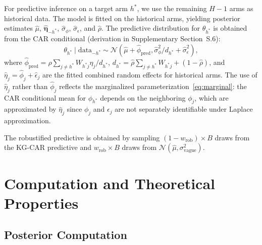 \documentclass[12pt]{article}
\begin{document}
For predictive inference on a target arm $h^*$, we use the remaining $H - 1$ arms as historical data. The model is fitted on the historical arms, yielding posterior estimates $\hat{\mu}$, $\hat{\boldsymbol{\eta}}_{-h^*}$, $\hat{\sigma}_\phi$, $\hat{\sigma}_\epsilon$, and $\hat{\rho}$. The predictive distribution for $\theta_{h^*}$ is obtained from the CAR conditional (derivation in Supplementary Section~S.6):
\begin{equation}
\label{eq:predictive}
\theta_{h^*} \mid \text{data}_{-h^*} \sim \mathcal{N}\left(\hat{\mu} + \hat{\phi}_{\text{pred}}, \hat{\sigma}_\phi^2 / d_{h^*} + \hat{\sigma}_\epsilon^2\right),
\end{equation}
where $\hat{\phi}_{\text{pred}} = \hat{\rho} \sum_{j \neq h^*} W_{h^* j} \hat{\eta}_j / d_{h^*}$, $d_{h^*} = \hat{\rho} \sum_{j \neq h^*} W_{h^* j} + (1 - \hat{\rho})$, and $\hat{\eta}_j = \hat{\phi}_j + \hat{\epsilon}_j$ are the fitted combined random effects for historical arms. The use of $\hat{\eta}_j$ rather than $\hat{\phi}_j$ reflects the marginalized parameterization~\eqref{eq:marginal}: the CAR conditional mean for $\phi_{h^*}$ depends on the neighboring $\phi_j$, which are approximated by $\hat{\eta}_j$ since $\phi_j$ and $\epsilon_j$ are not separately identifiable under Laplace approximation.

The robustified predictive is obtained by sampling $(1 - w_{\text{rob}}) \times B$ draws from the KG-CAR predictive and $w_{\text{rob}} \times B$ draws from $\mathcal{N}(\hat{\mu}, \sigma_{\text{vague}}^2)$.

\section{Computation and Theoretical Properties}
\label{sec:computation_theory}

\subsection{Posterior Computation}
\label{sec:computation}
\end{document}
